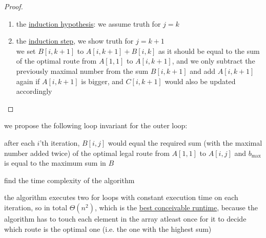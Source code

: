 \documentclass[a4paper,12pt]{article}
\begin{document}
\begin{question}
\begin{subquestion}
\begin{answer}
\begin{lemma}
\begin{proof}
\begin{enumerate}
\item the \href{20230108230724-induction_hypothesis.org}{induction hypothesis}: we assume truth for \(j=k\)\\
\item the \href{20230108230748-induction_step.org}{induction step}, we show truth for \(j=k+1\)\\
we set \(B[i,k+1]\) to \(A[i,k+1]+B[i,k]\) as it should be equal to the sum of the optimal route from \(A[1,1]\) to \(A[i,k+1]\), and we only subtract the previously maximal number from the sum \(B[i,k+1]\) and add \(A[i,k+1]\) again if \(A[i,k+1]\) is bigger, and \(C[i,k+1]\) would also be updated accordingly\\
\end{enumerate}
\end{proof}
\end{lemma}
we propose the following loop invariant for the outer loop:\\
\begin{lemma}
after each \(i\)'th iteration, \(B[i,j]\) would equal the required sum (with the maximal number added twice) of the optimal legal route from \(A[1,1]\) to \(A[i,j]\) and \(b_{\max}\) is equal to the maximum sum in \(B\)\\
\end{lemma}
\end{answer}
\end{subquestion}
\begin{subquestion}
find the time complexity of the algorithm\\
\begin{answer}
the algorithm executes two for loops with constant execution time on each iteration, so in total \(\Theta(n^2)\), which is the \href{20221130014441-time_complexity.org}{best conceivable runtime}, because the algorithm has to touch each element in the array atleast once for it to decide which route is the optimal one (i.e. the one with the highest sum)\\
\end{answer}
\end{subquestion}
\end{question}
\end{document}
